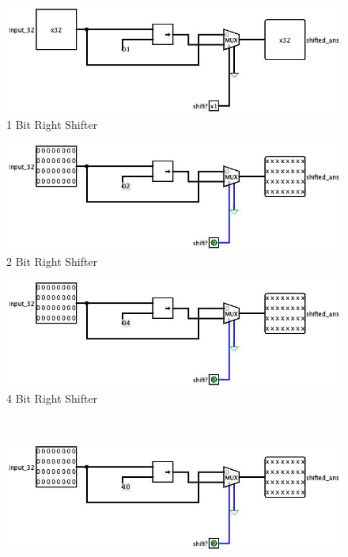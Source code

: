 \documentclass{article}
\begin{document}
\begin{figure}[h!]
\centering
\begin{minipage}{0.3\textwidth}
    \centering
    \includegraphics[width=\linewidth]{1bit.jpg}
    1 Bit Right Shifter
    \label{fig:1_bit_right_shift}
\end{minipage} 
\hfill
\begin{minipage}{0.3\textwidth}
    \centering
    \includegraphics[width=\linewidth]{2.jpg}
    2 Bit Right Shifter
    \label{fig:2_bit_right_shift}
\end{minipage} 
\hfill
\begin{minipage}{0.3\textwidth}
    \centering
    \includegraphics[width=\linewidth]{4.jpg}
    4 Bit Right Shifter
    \label{fig:4_bit_right_shift}
\end{minipage} 
\\
\vspace{0.5cm}
\begin{minipage}{0.3\textwidth}
    \centering
    \includegraphics[width=\linewidth]{8.jpg}

\end{minipage}
\end{figure}
\end{document}
